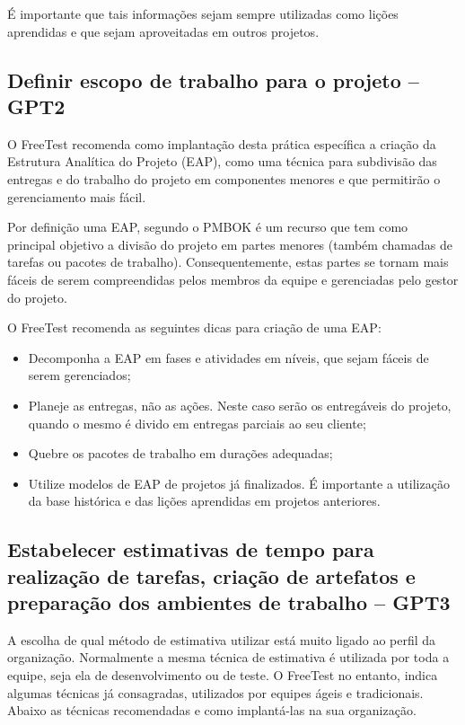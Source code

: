É importante que tais informações sejam sempre utilizadas como lições aprendidas e que sejam aproveitadas em outros projetos.

\subsection{Definir escopo de trabalho para o projeto – GPT2}
\label{sec:guiagpt2}

O FreeTest recomenda como implantação desta prática específica a criação da Estrutura Analítica do Projeto (EAP), como uma técnica para subdivisão das entregas e do trabalho do projeto em componentes menores e que permitirão o gerenciamento mais fácil.

Por definição uma EAP, segundo o PMBOK \cite{pmbok2014} é um recurso que tem como principal objetivo a divisão do projeto em partes menores (também chamadas de tarefas ou pacotes de trabalho). Consequentemente, estas partes se tornam mais fáceis de serem compreendidas pelos membros da equipe e gerenciadas pelo gestor do projeto.

O FreeTest recomenda as seguintes dicas para criação de uma EAP:

\begin{itemize}
	\item Decomponha a EAP em fases e atividades em níveis, que sejam fáceis de serem gerenciados;
	\item Planeje as entregas, não as ações. Neste caso serão os entregáveis do projeto, quando o mesmo é divido em entregas parciais ao seu cliente;
	\item Quebre os pacotes de trabalho em durações adequadas;
	\item Utilize modelos de EAP de projetos já finalizados. É importante a utilização da base histórica e das lições aprendidas em projetos anteriores.
\end{itemize}

\subsection{Estabelecer estimativas de tempo para realização de tarefas, criação de artefatos e preparação dos ambientes de trabalho – GPT3}
\label{sec:guiagpt3}

A escolha de qual método de estimativa utilizar está muito ligado ao perfil da organização. Normalmente a mesma técnica de estimativa é utilizada por toda a equipe, seja ela de desenvolvimento ou de teste. O FreeTest no entanto, indica algumas técnicas já consagradas, utilizados por equipes ágeis e tradicionais. Abaixo as técnicas recomendadas e como implantá-las na sua organização.

